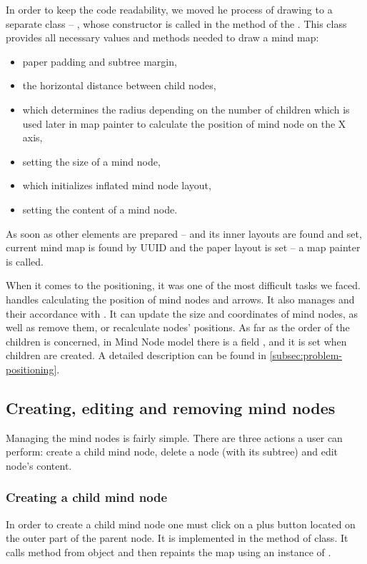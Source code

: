 In order to keep the code readability, we moved he process of drawing to a separate class -- , whose constructor is called in the  method of the . This class provides all necessary values and methods needed to draw a mind map:
\begin{itemize}
	\item paper padding and  subtree margin,
	\item the horizontal distance between child nodes,
	\item {} which determines the radius depending on the number of children which is used later in map painter to calculate the position of mind node on the X axis,
	\item {} setting the size of a mind node,
	\item {} which initializes inflated mind node layout,
	\item {} setting the content of a mind node.
\end{itemize}
 As soon as other elements are prepared --   and its inner  layouts are found and set, current mind map is found by UUID and the paper layout is set -- a map painter is called. 

When it comes to the positioning, it was one of the most difficult tasks we faced.  handles calculating the position of mind nodes and arrows. It also manages  and their accordance with . It can update the size and coordinates of mind nodes, as well as remove them, or recalculate nodes' positions. As far as the order of the children is concerned, in Mind Node model there is a field , and it is set when children are created. A detailed description can be found in \cref{subsec:problem-positioning}.

\subsection{Creating, editing and removing mind nodes}
\label{subsec:drawing}
Managing the mind nodes is fairly simple. There are three actions a user can perform:  create a child mind node, delete a node (with its subtree) and edit node's content. 

\subsubsection{Creating a child mind node}
\label{subsubsec:create-child}
In order to create a child mind node one must click on a plus button located on the outer part of the parent node. It is implemented in the  method of  class. It calls  method from  object and then repaints the map using an instance of .

